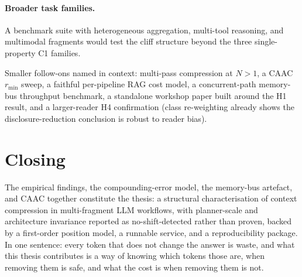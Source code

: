 \paragraph{Broader task families.}
A benchmark suite with heterogeneous aggregation, multi-tool
reasoning, and multimodal fragments would test the cliff structure
beyond the three single-property C1 families.

Smaller follow-ons named in context: multi-pass compression at
$N>1$, a CAAC $r_\text{min}$ sweep, a faithful per-pipeline RAG cost
model, a concurrent-path memory-bus throughput benchmark, a
standalone workshop paper built around the H1 result, and a
larger-reader H4 confirmation (class re-weighting already shows the
disclosure-reduction conclusion is robust to reader bias).

\section{Closing}

The empirical findings, the compounding-error model, the memory-bus artefact,
and CAAC together constitute the thesis: a structural characterisation of
context compression in multi-fragment LLM workflows, with planner-scale and
architecture invariance reported as no-shift-detected rather than proven, backed
by a first-order position model, a runnable service, and a reproducibility
package. In one sentence: every token that does not change the answer is waste,
and what this thesis contributes is a way of knowing which tokens those are,
when removing them is safe, and what the cost is when removing them is not.
